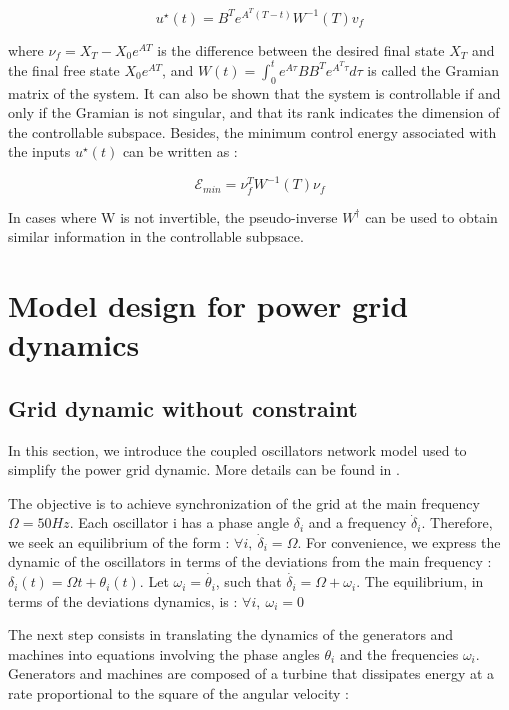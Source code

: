 \documentclass[conference]{IEEEtran}
\begin{document}
\begin{equation}
\label{eq:ustar}
 u^{\star}(t) = B^{T}e^{ A^{T}(T-t) } W^{-1}(T) v_f 
\end{equation}


\noindent where $ \nu_f = X_T - X_0 e^{AT} $ is the difference between the desired final state $X_T$ and the final free state $X_0 e^{AT} $, and $W(t) = \int_{0}^{t} e^{A \tau}BB^{T} e^{A^{T} \tau} d\tau $ is called the Gramian matrix of the system. It can also be shown that the system is controllable if and only if the Gramian is not singular, and that its rank indicates the dimension of the controllable subspace. Besides, the minimum control energy associated with the inputs $ u^{\star}(t)$ can be written as :


\begin{equation}
\label{eq:energy}
 \mathcal{E}_{min} = \nu_f^T W^{-1}(T) \nu_f
\end{equation}

In cases where W is not invertible, the pseudo-inverse $W^{\dagger}$ can be used to obtain similar information in the controllable subpsace. 


\section{Model design for power grid dynamics}
\label{sec:The_Model}

\subsection{Grid dynamic without constraint}

In this section, we introduce the coupled oscillators network model used to simplify the power grid dynamic. More details can be found in \cite{Filatrella2008}.

 The objective is to achieve synchronization of the grid at the main frequency $ \Omega = 50 Hz $. Each oscillator i has a phase angle $ \delta_i $ and a frequency $ \dot{\delta}_i $. Therefore, we seek an equilibrium of the form : $ \forall i,\ \dot{\delta}_i = \Omega $. For convenience, we express the dynamic of the oscillators in terms of the deviations from the main frequency : $ \delta_i(t) = \Omega t + \theta_i(t) $. Let $ \omega_i = \dot{\theta_i} $, such that $ \dot{\delta_i} = \Omega + \omega_i $. The equilibrium, in terms of the deviations dynamics, is : $ \forall i,\ \omega_i = 0 $

The next step consists in translating the dynamics of the generators and machines into equations involving the phase angles $ \theta_i $ and the frequencies $ \omega_i$. Generators and machines are composed of a turbine that dissipates energy at a rate proportional to the square of the angular velocity : 
\end{document}
